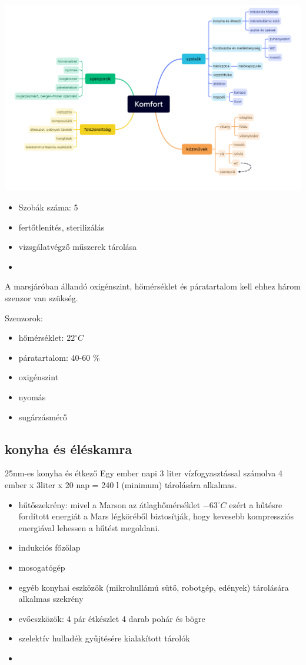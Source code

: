 \documentclass{report}
\begin{document}
\includegraphics[scale=0.4]{images/komfort01.png}



\begin{itemize}
    \item Szobák száma: 5
    \item fertőtlenítés, sterilizálás
    \item vizsgálatvégző műszerek tárolása
    \item 
\end{itemize}

A marsjáróban állandó oxigénszint, hőmérséklet és páratartalom kell ehhez három szenzor van szükség.

Szenzorok:
\begin{itemize}
    \item hőmérséklet: $22^\circ C $ 
    \item páratartalom: 40-60 \%
    \item oxigénszint
    \item nyomás
    \item sugárzásmérő
\end{itemize}

\subsection{konyha és éléskamra}

25nm-es konyha és étkező
Egy ember napi 3 liter vízfogyasztással számolva 4 ember x 3liter x 20 nap = 240 l (minimum) tárolására alkalmas.
\begin{itemize}
    \item hűtőszekrény: mivel a Marson az átlaghőmérséklet $ -63^\circ C $ ezért a hűtésre fordított energiát a Mars légköréből biztosítják, hogy kevesebb kompressziós energiával lehessen a hűtést megoldani.
    \item indukciós főzőlap
    \item mosogatógép
    \item egyéb konyhai eszközök (mikrohullámú sütő, robotgép, edények) tárolására alkalmas szekrény
    \item evőeszközök: 4 pár étkészlet 4 darab pohár és bögre
    \item szelektív hulladék gyűjtésére kialakított tárolók
    \item 
\end{itemize}
\end{document}
